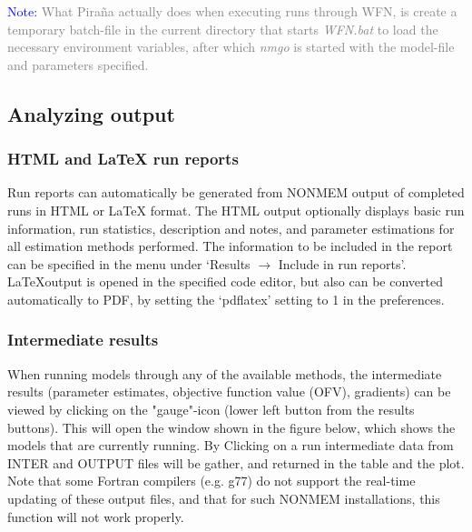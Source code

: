 \documentclass[a4,11pt]{report} \usepackage[pdftex]{graphicx}
\begin{document}
\vspace{10pt}
\noindent\scriptsize{\textcolor{Blue}{Note:} \textcolor{Grey} {What Pira\~na actually does when executing runs through WFN, is create a temporary batch-file in the current directory that starts \emph{WFN.bat} to load the necessary environment variables, after which \emph{nmgo} is started with the model-file and parameters specified.}
  \normalsize

\subsection{Analyzing output}

\subsubsection*{HTML and \LaTeX \hspace{2pt} run reports} Run reports
can automatically be generated from NONMEM output of completed runs in
HTML or \LaTeX \hspace{2pt} format. The HTML output optionally
displays basic run information, run statistics, description and notes,
and parameter estimations for all estimation methods performed. The
information to be included in the report can be specified in the menu
under `Results $\rightarrow$ Include in run reports'. \LaTeX output is
opened in the specified code editor, but also can be converted
automatically to PDF, by setting the `pdflatex' setting to 1 in the
preferences.

\subsubsection*{Intermediate results} When running models through any
of the available methods, the intermediate results (parameter
estimates, objective function value (OFV), gradients) can be viewed by
clicking on the "gauge"-icon (lower left button from the results
buttons). This will open the window shown in the figure below, which
shows the models that are currently running. By Clicking on a run
intermediate data from INTER and OUTPUT files will be gather, and
returned in the table and the plot. Note that some Fortran
compilers (e.g. g77) do not support the real-time updating of these
output files, and that for such NONMEM installations, this function
will not work properly.

}
\end{document}
